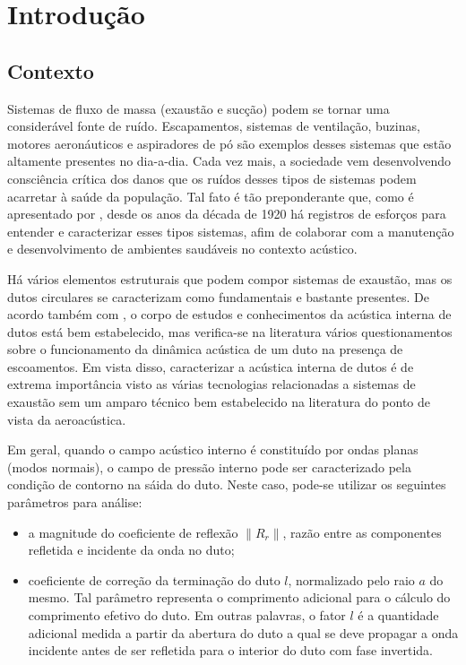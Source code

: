 \chapter{Introdução}
\label{chapter:introdcao}

\section{Contexto}

Sistemas de fluxo de massa (exaustão e sucção) podem se tornar uma considerável fonte de ruído. Escapamentos, sistemas de ventilação, buzinas, motores aeronáuticos e aspiradores de pó são exemplos desses sistemas que estão altamente presentes no dia-a-dia. Cada vez mais, a sociedade vem desenvolvendo consciência crítica dos danos que os ruídos desses tipos de sistemas podem acarretar à saúde da população. Tal fato é tão preponderante que, como é apresentado por , desde os anos da década de 1920 há registros de esforços para entender e caracterizar esses tipos sistemas, afim de colaborar com a manutenção e desenvolvimento de ambientes saudáveis no contexto acústico.

Há vários elementos estruturais que podem compor sistemas de exaustão, mas os dutos circulares se caracterizam como fundamentais e bastante presentes. De acordo também com , o corpo de estudos e conhecimentos da acústica interna de dutos está bem estabelecido, mas verifica-se na literatura vários questionamentos sobre o funcionamento da dinâmica acústica de um duto na presença de escoamentos. Em vista disso, caracterizar a acústica interna de dutos é de extrema importância visto as várias tecnologias relacionadas a sistemas de exaustão sem um amparo técnico bem estabelecido na literatura do ponto de vista da aeroacústica.

Em geral, quando o campo acústico interno é constituído por ondas planas (modos normais), o campo de pressão interno pode ser caracterizado pela condição de contorno na sáida do duto. Neste caso, pode-se utilizar os seguintes parâmetros para análise:

\begin{itemize}
    \item a magnitude do coeficiente de reflexão $\|R_{r}\|$, razão entre as componentes refletida e incidente da onda no duto;
    

    \item coeficiente de correção da terminação do duto $l$, normalizado pelo raio $a$ do mesmo. Tal parâmetro representa o comprimento adicional para o cálculo do comprimento efetivo do duto. Em outras palavras, o fator $l$ é a quantidade adicional medida a partir da abertura do duto a qual se deve propagar a onda incidente antes de ser refletida para o interior do duto com fase invertida.
\end{itemize}

